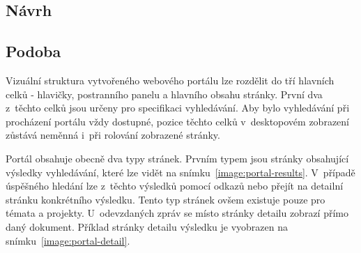 \subsection{Návrh}
\blindtext

\subsection{Podoba}
Vizuální struktura vytvořeného webového portálu lze rozdělit do tří hlavních celků - hlavičky, postranního panelu a hlavního obsahu stránky. První dva z~těchto celků jsou určeny pro specifikaci vyhledávání. Aby bylo vyhledávání při procházení portálu vždy dostupné, pozice těchto celků v~desktopovém zobrazení zůstává neměnná i~při rolování zobrazené stránky.

Portál obsahuje obecně dva typy stránek. Prvním typem jsou stránky obsahující výsledky vyhledávání, které lze vidět na snímku~\ref{image:portal-results}. V~případě úspěšného hledání lze z~těchto výsledků pomocí odkazů  nebo  přejít na detailní stránku konkrétního výsledku. Tento typ stránek ovšem existuje pouze pro témata a projekty. U~odevzdaných zpráv se místo stránky detailu zobrazí přímo daný dokument. Příklad stránky detailu výsledku je vyobrazen na snímku~\ref{image:portal-detail}.

